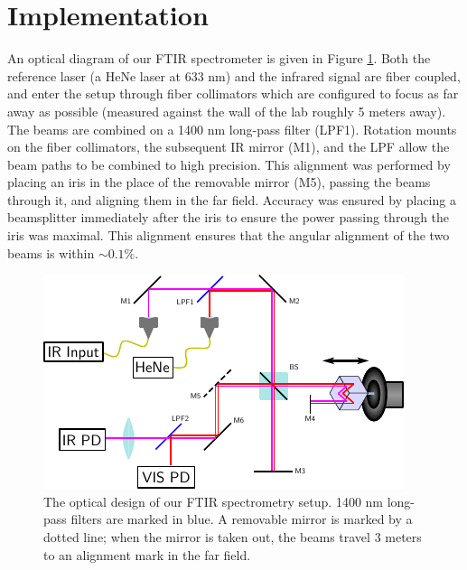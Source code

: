 \documentclass[12pt]{puthesis}
\begin{document}

\section{Implementation}

An optical diagram of our FTIR spectrometer is given in Figure \ref{fig:ftirdiagram}. Both the reference laser (a HeNe laser at 633 nm) and the infrared signal are fiber coupled, and enter the setup through fiber collimators which are configured to focus as far away as possible (measured against the wall of the lab roughly 5 meters away). The beams are combined on a 1400 nm long-pass filter (LPF1). Rotation mounts on the fiber collimators, the subsequent IR mirror (M1), and the LPF allow the beam paths to be combined to high precision. This alignment was performed by placing an iris in the place of the removable mirror (M5), passing the beams through it, and aligning them in the far field. Accuracy was ensured by placing a beamsplitter immediately after the iris to ensure the power passing through the iris was maximal. This alignment ensures that the angular alignment of the two beams is within $\sim 0.1\%$.

\begin{figure}[b]
  \centering
  \includegraphics[width=\textwidth]{FTIRSetupDiagram}
  \caption{The optical design of our FTIR spectrometry setup. 1400 nm long-pass filters are marked in blue. A removable mirror is marked by a dotted line; when the mirror is taken out, the beams travel 3 meters to an alignment mark in the far field. }
  \label{fig:ftirdiagram}
\end{figure}
\end{document}
